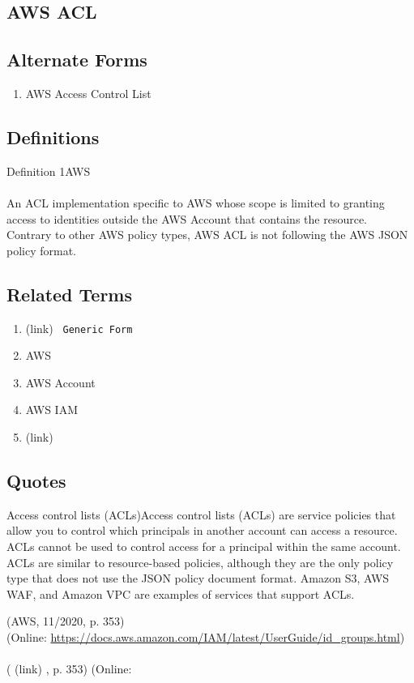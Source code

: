 \newpage \subsection*{AWS ACL } \subsection*{Alternate Forms } \begin{enumerate} \item  AWS Access Control List  \end{enumerate} \subsection*{Definitions } \begin{DIC_Def}{Definition 1AWS }{} \paragraph{} An ACL implementation specific to AWS whose scope is limited to granting access to identities outside the AWS Account that contains the resource. Contrary to other AWS policy types, AWS ACL is not following the AWS JSON policy format.  \end{DIC_Def} \subsection*{Related Terms } \begin{enumerate} \item  (link) \href{Access Control List (Dictionary Entry) }{ }   \texttt{ Generic Form  } \item  AWS  \item  AWS Account  \item  AWS IAM  \item  (link) \href{AWS IAM Policy (Dictionary Entry) }{ }   \end{enumerate} \subsection*{Quotes } \begin{DIC_BlockQuote} Access control lists (ACLs)Access control lists (ACLs) are service policies that allow you to control which principals in another account can access a resource. ACLs cannot be used to control access for a principal within the same account. ACLs are similar to resource-based policies, although they are the only policy type that does not use the JSON policy document format. Amazon S3, AWS WAF, and Amazon VPC are examples of services that support ACLs.  \end{DIC_BlockQuote} (AWS, 11/2020, p. 353)\\ (Online: \url{https://docs.aws.amazon.com/IAM/latest/UserGuide/id_groups.html})  \paragraph{} (  (link) \href{AWS, 11/2020 }{ } , p. 353)  (Online:  